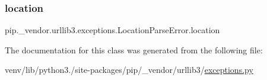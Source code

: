 \subsubsection{\texorpdfstring{location}{location}}
{\footnotesize\ttfamily pip.\+\_\+vendor.\+urllib3.\+exceptions.\+Location\+Parse\+Error.\+location}



The documentation for this class was generated from the following file\+:\begin{DoxyCompactItemize}
\item 
venv/lib/python3./site-\/packages/pip/\+\_\+vendor/urllib3/\hyperlink{pip_2__vendor_2urllib3_2exceptions_8py}{exceptions.\+py}\end{DoxyCompactItemize}

